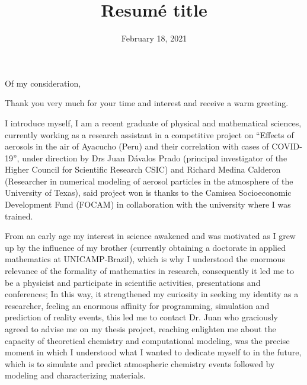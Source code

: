 \documentclass[11pt,a4paper,roman]{moderncv}        %
\title{Resumé title}                               %
\begin{document}
\date{February 18, 2021} %
\opening{Of my consideration,}
\closing{Thank you very much for your time and interest and receive a warm greeting.}
\makelettertitle
\justify
I introduce myself, I am a recent graduate of physical and mathematical sciences, currently working as a research assistant in a competitive project on ``Effects of aerosols in the air of Ayacucho (Peru) and their correlation with cases of COVID-19'', under direction by Drs Juan Dávalos Prado (principal investigator of the Higher Council for Scientific Research CSIC) and Richard Medina Calderon (Researcher in numerical modeling of aerosol particles in the atmosphere of the University of Texas), said project won is thanks to the Camisea Socioeconomic Development Fund (FOCAM) in collaboration with the university where I was trained.

From an early age my interest in science awakened and was motivated as I grew up by the influence of my brother (currently obtaining a doctorate in applied mathematics at UNICAMP-Brazil), which is why I understood the enormous relevance of the formality of mathematics in research, consequently it led me to be a physicist and participate in scientific activities, presentations and conferences; In this way, it strengthened my curiosity in seeking my identity as a researcher, feeling an enormous affinity for programming, simulation and prediction of reality events, this led me to contact Dr. Juan who graciously agreed to advise me on my thesis project, reaching enlighten me about the capacity of theoretical chemistry and computational modeling, was the precise moment in which I understood what I wanted to dedicate myself to in the future, which is to simulate and predict atmospheric chemistry events followed by modeling and characterizing materials.
\end{document}
